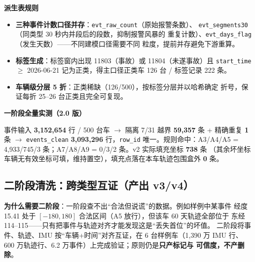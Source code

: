 \noindent\textbf{派生表规则}\mbox{}
\begin{itemize}
  \item \textbf{三种事件计数口径并存}：\texttt{evt\_raw\_count}（原始报警条数）、
        \texttt{evt\_segments30}（同类型 30 秒内并段后的段数，抑制报警风暴的
        重复计数）、\texttt{evt\_days\_flag}（发生天数）——不同建模口径需要不同
        粒度，提前并存避免下游重算。
  \item \textbf{标签生成}：标签窗内出现 11803（事故）或 11804（未遂事故）且
        \texttt{start\_time} $\ge$ 2026-06-21 记为正类，得主口径正类车 126 台 /
        标签记录 222 条。
  \item \textbf{车辆级分层 5 折}：正类稀缺（126/500），按标签分层并以哈希确定
        折号，保证每折 25--26 台正类且完全可复现。
\end{itemize}

\noindent\textbf{一阶段全量实测（2.0 版）}\mbox{}
\begin{hlbox}
事件输入 \textbf{3{,}152{,}654} 行 / 500 台车 $\to$ 隔离 7/31 越界
\textbf{59{,}357} 条 + 精确重复 \textbf{1} 条 $\to$ \texttt{events\_clean}
\textbf{3{,}093{,}296} 行，\texttt{row\_id} 唯一。规则命中：A3/A4/A5 =
4{,}933/745/3 条；A7/A8/A9 = 0/3/2 条。v2 实际填充坐标 \textbf{738} 条
（其余坏坐标车辆无有效坐标可填，维持置空），填充点落在本车轨迹包围盒外
\textbf{0} 条。
\end{hlbox}

\subsection{二阶段清洗：跨类型互证（产出 v3/v4）}

\textbf{为什么需要二阶段}：一阶段查不出“合法但说谎”的数据。例如样例中某事件
经度 15.41 处于 $[-180,180]$ 合法区间（A5 放行），但该车 60 天轨迹全部位于
东经 114--115——只有把事件与轨迹对齐才能发现这是“丢失首位”的坏值。
二阶段将事件、轨迹、IMU 按“车辆+时间”对齐互证，在 6 台样例车（1{,}390 万
IMU 行、600 万轨迹行、6.2 万事件）上完成验证；原则仍是\textbf{只产标记与
可信度，不产删除}。

